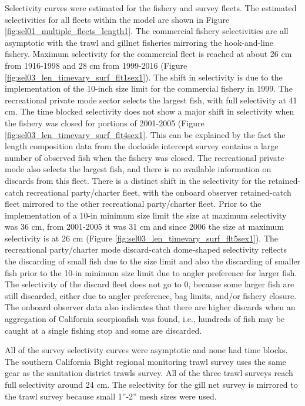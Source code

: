 \documentclass[12pt,]{article}
\begin{document}
Selectivity curves were estimated for the fishery and survey fleets. The
estimated selectivities for all fleets within the model are shown in
Figure \ref{fig:sel01_multiple_fleets_length1}. The commercial fishery
selectivities are all asymptotic with the trawl and gillnet fisheries
mirroring the hook-and-line fishery. Maximum selectivity for the
commercial fleet is reached at about 26 cm from 1916-1998 and 28 cm from
1999-2016 (Figure \ref{fig:sel03_len_timevary_surf_flt1sex1}). The shift
in selectivity is due to the implementation of the 10-inch size limit
for the commercial fishery in 1999. The recreational private mode sector
selects the largest fish, with full selectivity at 41 cm. The time
blocked selectivity does not show a major shift in selectivity when the
fishery was closed for portions of 2001-2005 (Figure
\ref{fig:sel03_len_timevary_surf_flt4sex1}. This can be explained by the
fact the length composition data from the dockside intercept survey
contains a large number of observed fish when the fishery was closed.
The recreational private mode also selects the largest fish, and there
is no available information on discards from this fleet. There is a
distinct shift in the selectivity for the retained-catch recreational
party/charter fleet, with the onboard observer retained-catch fleet
mirrored to the other recreational party/charter fleet. Prior to the
implementation of a 10-in minimum size limit the size at maximum
selectivity was 36 cm, from 2001-2005 it was 31 cm and since 2006 the
size at maximum selectivity is at 26 cm (Figure
\ref{fig:sel03_len_timevary_surf_flt5sex1}). The recreational
party/charter mode discard-catch dome-shaped selectivity reflects the
discarding of small fish due to the size limit and also the discarding
of smaller fish prior to the 10-in minimum size limit due to angler
preference for larger fish. The selectivity of the discard fleet does
not go to 0, because some larger fish are still discarded, either due to
angler preference, bag limits, and/or fishery closure. The onboard
observer data also indicates that there are higher discards when an
aggregation of California scorpionfish was found, i.e., hundreds of fish
may be caught at a single fishing stop and some are discarded.

All of the survey selectivity curves were asymptotic and none had time
blocks. The southern California Bight regional monitoring trawl survey
uses the same gear as the sanitation district trawls survey. All of the
three trawl surveys reach full selectivity around 24 cm. The selectivity
for the gill net survey is mirrored to the trawl survey because small
1''-2'' mesh sizes were used.
\end{document}
